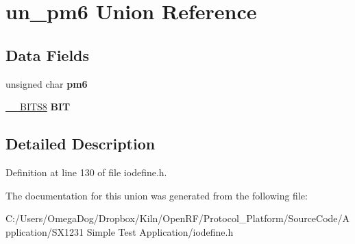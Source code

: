 \hypertarget{unionun__pm6}{\section{un\-\_\-pm6 Union Reference}
\label{unionun__pm6}
}
\subsection*{Data Fields}
\begin{DoxyCompactItemize}
\item 
\hypertarget{unionun__pm6_a8834889c831e05510cf71f841fd3f33f}{unsigned char {\bfseries pm6}}\label{unionun__pm6_a8834889c831e05510cf71f841fd3f33f}

\item 
\hypertarget{unionun__pm6_af5d51ea68d733980c4031548bafa48c8}{\hyperlink{struct_____b_i_t_s8}{\-\_\-\-\_\-\-B\-I\-T\-S8} {\bfseries B\-I\-T}}\label{unionun__pm6_af5d51ea68d733980c4031548bafa48c8}

\end{DoxyCompactItemize}


\subsection{Detailed Description}


Definition at line 130 of file iodefine.\-h.



The documentation for this union was generated from the following file\-:\begin{DoxyCompactItemize}
\item 
C\-:/\-Users/\-Omega\-Dog/\-Dropbox/\-Kiln/\-Open\-R\-F/\-Protocol\-\_\-\-Platform/\-Source\-Code/\-Application/\-S\-X1231 Simple Test Application/iodefine.\-h\end{DoxyCompactItemize}
